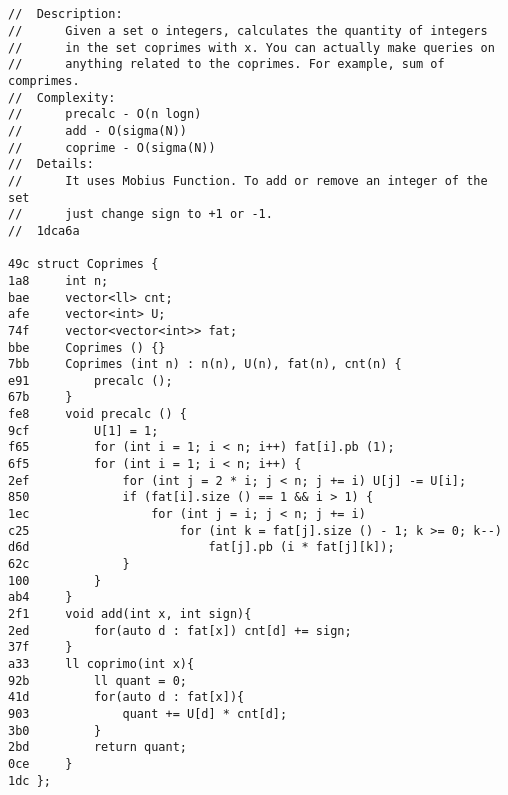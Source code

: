 \documentclass[11pt, a4paper, twoside]{article}
\begin{document}
\subsection{}
\begin{lstlisting}
//  Description: 
//      Given a set o integers, calculates the quantity of integers
//      in the set coprimes with x. You can actually make queries on
//      anything related to the coprimes. For example, sum of comprimes.
//  Complexity: 
//      precalc - O(n logn)
//      add - O(sigma(N))
//      coprime - O(sigma(N))
//  Details:
//      It uses Mobius Function. To add or remove an integer of the set
//      just change sign to +1 or -1.
//  1dca6a

49c struct Coprimes {
1a8     int n;
bae     vector<ll> cnt;
afe     vector<int> U;
74f     vector<vector<int>> fat;
bbe     Coprimes () {}
7bb     Coprimes (int n) : n(n), U(n), fat(n), cnt(n) {
e91         precalc ();
67b     }
fe8     void precalc () {
9cf         U[1] = 1;
f65         for (int i = 1; i < n; i++) fat[i].pb (1);
6f5         for (int i = 1; i < n; i++) {
2ef             for (int j = 2 * i; j < n; j += i) U[j] -= U[i];
850             if (fat[i].size () == 1 && i > 1) {
1ec                 for (int j = i; j < n; j += i)
c25                     for (int k = fat[j].size () - 1; k >= 0; k--) 
d6d                         fat[j].pb (i * fat[j][k]);
62c             }
100         }
ab4     }
2f1     void add(int x, int sign){
2ed         for(auto d : fat[x]) cnt[d] += sign;
37f     }
a33     ll coprimo(int x){
92b         ll quant = 0;
41d         for(auto d : fat[x]){
903             quant += U[d] * cnt[d];
3b0         }
2bd         return quant;
0ce     }
1dc };
\end{lstlisting}
\end{document}
